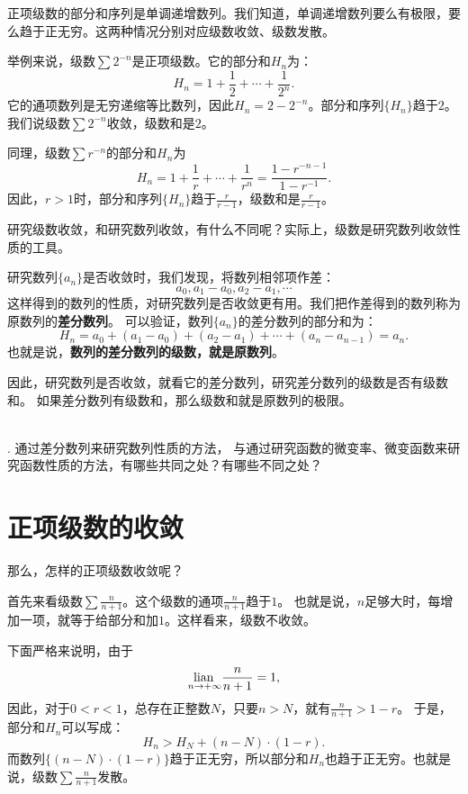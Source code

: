 \documentclass[12pt,UTF8,fontset=none]{ctexbook}
\begin{document}
正项级数的部分和序列是单调递增数列。我们知道，单调递增数列要么有极限，要么趋于正无穷。这两种情况分别对应级数收敛、级数发散。

举例来说，级数$\sum 2^{-n}$是正项级数。它的部分和$H_n$为：
$$ H_n = 1 + \frac{1}{2} + \cdots + \frac{1}{2^n}.$$
它的通项数列是无穷递缩等比数列，因此$H_n = 2 - 2^{-n}$。部分和序列$\{H_n\}$趋于$2$。
我们说级数$\sum 2^{-n}$收敛，级数和是$2$。

同理，级数$\sum r^{-n}$的部分和$H_n$为
$$ H_n = 1 + \frac{1}{r} + \cdots + \frac{1}{r^n} = \frac{1 - r^{-n-1}}{1 - r^{-1}}.$$
因此，$r>1$时，部分和序列$\{H_n\}$趋于$\frac{r}{r - 1}$，级数和是$\frac{r}{r - 1}$。

研究级数收敛，和研究数列收敛，有什么不同呢？实际上，级数是研究数列收敛性质的工具。

研究数列$\{a_n\}$是否收敛时，我们发现，将数列相邻项作差：
$$ a_0, a_1 - a_0, a_2 - a_1, \cdots $$
这样得到的数列的性质，对研究数列是否收敛更有用。我们把作差得到的数列称为原数列的\textbf{差分数列}。
可以验证，数列$\{a_n\}$的差分数列的部分和为：
$$ H_n = a_0 + (a_1 - a_0) + (a_2 - a_1) + \cdots + (a_n - a_{n-1}) = a_n. $$
也就是说，\textbf{数列的差分数列的级数，就是原数列}。

因此，研究数列是否收敛，就看它的差分数列，研究差分数列的级数是否有级数和。
如果差分数列有级数和，那么级数和就是原数列的极限。

\begin{sk}
    \mbox{} \\
    . 通过差分数列来研究数列性质的方法，
    与通过研究函数的微变率、微变函数来研究函数性质的方法，有哪些共同之处？有哪些不同之处？
\end{sk}

\section{正项级数的收敛}
那么，怎样的正项级数收敛呢？

首先来看级数$\sum \frac{n}{n+1}$。这个级数的通项$\frac{n}{n+1}$趋于$1$。
也就是说，$n$足够大时，每增加一项，就等于给部分和加$1$。这样看来，级数不收敛。

下面严格来说明，由于
$$\underset{n\to +\infty }{\operatorname{lian}\,}\frac{n}{n+1} = 1,$$
因此，对于$0<r<1$，总存在正整数$N$，只要$n>N$，就有$\frac{n}{n+1} > 1 - r$。
于是，部分和$H_n$可以写成：
$$ H_n > H_N + (n - N) \cdot (1 - r).$$
而数列$\{(n - N) \cdot (1 - r)\}$趋于正无穷，所以部分和$H_n$也趋于正无穷。也就是说，级数$\sum \frac{n}{n+1}$发散。
\end{document}
